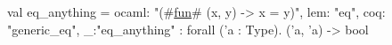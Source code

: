 val eq_anything = {ocaml: "(#\hyperref[zfun]{fun}# (x, y) -> x = y)", lem: "eq", coq: "generic_eq", _:"eq_anything"} : forall ('a : Type). ('a, 'a) -> bool
